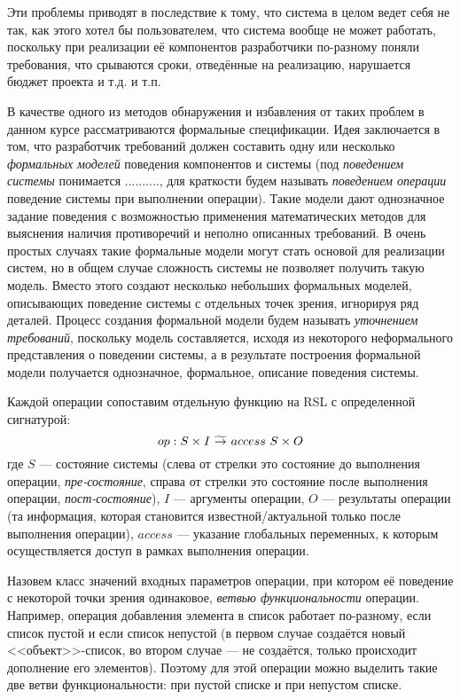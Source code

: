 \documentclass[14pt, twoside]{extreport}
\begin{document}
Эти проблемы приводят в последствие к тому, что система в целом ведет себя не так, как этого хотел бы пользователем, что система вообще не может работать, поскольку при реализации её компонентов разработчики по-разному поняли требования, что срываются сроки, отведённые на реализацию, нарушается бюджет проекта и т.д. и т.п.

В качестве одного из методов обнаружения и избавления от таких проблем в данном курсе рассматриваются формальные спецификации. Идея заключается в том, что разработчик требований должен составить одну или несколько \emph{формальных моделей} поведения компонентов и системы (под \emph{поведением системы} понимается .........., для краткости будем называть \emph{поведением операции} поведение системы при выполнении операции). Такие модели дают однозначное задание поведения с возможностью применения математических методов для выяснения наличия противоречий и неполно описанных требований. В очень простых случаях такие формальные модели могут стать основой для реализации систем, но в общем случае сложность системы не позволяет получить такую модель. Вместо этого создают несколько небольших формальных моделей, описывающих поведение системы с отдельных точек зрения, игнорируя ряд деталей. Процесс создания формальной модели будем называть \emph{уточнением требований}, поскольку модель составляется, исходя из некоторого неформального представления о поведении системы, а в результате построения формальной модели получается однозначное, формальное, описание поведения системы.

Каждой операции сопоставим отдельную функцию на RSL с определенной сигнатурой:
$$op : S \times I ~\widetilde{\rightarrow}~access~ S \times O$$
где $S$ --- состояние системы (слева от стрелки это состояние до выполнения операции, \emph{пре-состояние}, справа от стрелки это состояние после выполнения операции, \emph{пост-состояние}), $I$ --- аргументы операции, $O$ --- результаты операции (та информация, которая становится известной/актуальной только после выполнения операции), $access$ --- указание глобальных переменных, к которым осуществляется доступ в рамках выполнения операции.

Назовем класс значений входных параметров операции, при котором её поведение с некоторой точки зрения одинаковое, \emph{ветвью функциональности} операции. Например, операция добавления элемента в список работает по-разному, если список пустой и если список непустой (в первом случае создаётся новый <<объект>>-список, во втором случае --- не создаётся, только происходит дополнение его элементов). Поэтому для этой операции можно выделить такие две ветви функциональности: при пустой списке и при непустом списке.
\end{document}
